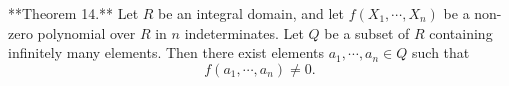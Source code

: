 **Theorem 14.** Let $R$ be an integral domain, and let $f(X_1, \cdots, X_n)$ be a non-zero polynomial over $R$ in $n$ indeterminates. Let $Q$ be a subset of $R$ containing infinitely many elements. Then there exist elements $a_1, \cdots, a_n \in Q$ such that
$$f(a_1, \cdots, a_n) \neq 0.$$
